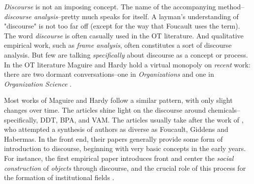 

\textit{Discourse} is not an imposing concept. The name of the accompanying method--\textit{discourse analysis}--pretty much speaks for itself. A layman's understanding of "discourse" is not too far off (except for the way that Foucault uses the term). The word \textit{discourse} is often casually used in the OT literature. And qualitative empirical work, such as \textit{frame analysis}, often constitutes a sort of discourse analysis. But few are talking \textit{specifically} about discourse as a concept or process. In the OT literature Maguire and Hardy hold a virtual monopoly on \textit{recent} work: there are two dormant conversations--one in \textit{Organizations} \citep[e.g.,][]{Burrell2000} and one in \textit{Organization Science} \citep[e.g.,][]{Grant2004}.


Most works of Maguire and Hardy follow a similar pattern, with only slight changes over time. The articles shine light on the discourse around chemicals--specifically, DDT, BPA, and VAM. The articles usually take after the work of \citep{Fairclough1992}, who attempted a synthesis of authors as diverse as Foucault, Giddens and Habermas. In the front end, their papers generally provide some form of introduction to discourse, beginning with very basic concepts in the early years. For instance, the first empirical paper introduces front and center the \textit{social construction} of \textit{objects} through discourse, and the crucial role of this process for the formation of institutional fields \citep{Hardy1999}.



